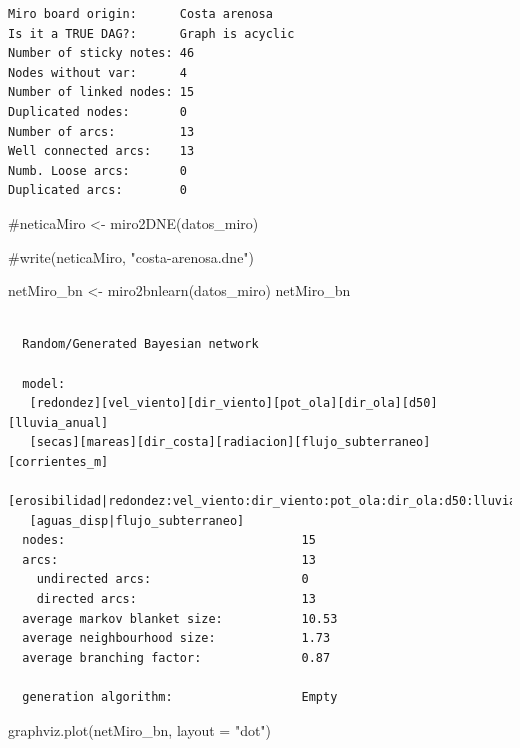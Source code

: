 \documentclass[
  letterpaper,
  DIV=11,
  numbers=noendperiod]{scrreprt}
\newenvironment{Shaded}{\begin{snugshade}}{\end{snugshade}}
\newcommand{\AttributeTok}[1]{\textcolor[rgb]{0.40,0.45,0.13}{#1}}
\newcommand{\CommentTok}[1]{\textcolor[rgb]{0.37,0.37,0.37}{#1}}
\newcommand{\FunctionTok}[1]{\textcolor[rgb]{0.28,0.35,0.67}{#1}}
\newcommand{\NormalTok}[1]{\textcolor[rgb]{0.00,0.23,0.31}{#1}}
\newcommand{\OtherTok}[1]{\textcolor[rgb]{0.00,0.23,0.31}{#1}}
\newcommand{\SpecialCharTok}[1]{\textcolor[rgb]{0.37,0.37,0.37}{#1}}
\newcommand{\StringTok}[1]{\textcolor[rgb]{0.13,0.47,0.30}{#1}}
\begin{document}
\begin{verbatim}
Miro board origin:      Costa arenosa
Is it a TRUE DAG?:      Graph is acyclic
Number of sticky notes: 46
Nodes without var:      4
Number of linked nodes: 15
Duplicated nodes:       0
Number of arcs:         13
Well connected arcs:    13
Numb. Loose arcs:       0
Duplicated arcs:        0
\end{verbatim}

\begin{Shaded}
\begin{Highlighting}[]
\CommentTok{\#neticaMiro \textless{}{-} miro2DNE(datos\_miro)}

\CommentTok{\#write(neticaMiro, "costa{-}arenosa.dne")}

\NormalTok{netMiro\_bn }\OtherTok{\textless{}{-}} \FunctionTok{miro2bnlearn}\NormalTok{(datos\_miro)}
\NormalTok{netMiro\_bn}
\end{Highlighting}
\end{Shaded}

\begin{verbatim}

  Random/Generated Bayesian network

  model:
   [redondez][vel_viento][dir_viento][pot_ola][dir_ola][d50][lluvia_anual]
   [secas][mareas][dir_costa][radiacion][flujo_subterraneo][corrientes_m]
   [erosibilidad|redondez:vel_viento:dir_viento:pot_ola:dir_ola:d50:lluvia_anual:secas:mareas:dir_costa:radiacion:corrientes_m]
   [aguas_disp|flujo_subterraneo]
  nodes:                                 15 
  arcs:                                  13 
    undirected arcs:                     0 
    directed arcs:                       13 
  average markov blanket size:           10.53 
  average neighbourhood size:            1.73 
  average branching factor:              0.87 

  generation algorithm:                  Empty 
\end{verbatim}

\begin{Shaded}
\end{Shaded}

\begin{Shaded}
\begin{Highlighting}[]
\FunctionTok{graphviz.plot}\NormalTok{(netMiro\_bn, }\AttributeTok{layout =} \StringTok{"dot"}\NormalTok{)}
\end{Highlighting}
\end{Shaded}
\end{document}
